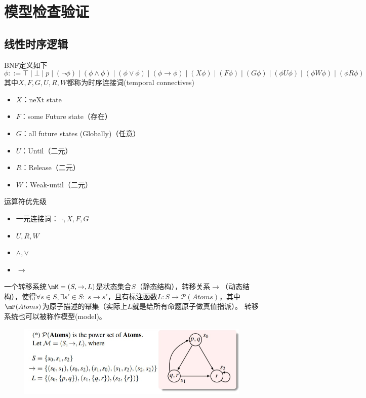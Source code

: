 
\section{模型检查验证}
\subsection{线性时序逻辑}
\begin{definition}
BNF定义如下
\[\phi::=\top\mid\bot\mid p\mid
(\lnot\phi)\mid
(\phi\land\phi)\mid
(\phi\lor\phi)\mid
(\phi\to\phi)\mid
(X\phi)\mid
(F\phi)\mid
(G\phi)\mid
(\phi U\phi)\mid
(\phi W\phi)\mid
(\phi R\phi)\]
其中$X,F,G,U,R,W$都称为时序连接词(temporal connectives)
\begin{itemize}
	\item $X$：neXt state
	\item $F$：some Future state（存在）
	\item $G$：all future states (Globally)（任意）
	\item $U$：Until（二元）
	\item $R$：Release（二元）
	\item $W$：Weak-until（二元）
\end{itemize}
运算符优先级
\begin{itemize}
	\item 一元连接词：$\lnot,X,F,G$
	\item $U,R,W$
	\item $\land,\lor$
	\item $\to$
\end{itemize}
\end{definition}
\begin{definition}
一个转移系统$\mM=(S,\to,L)$是状态集合$S$（静态结构），转移关系$\to$（动态结构），使得$\forall s\in S,\exists s'\in S:\;s\to s'$，且有标注函数$L:S\to\mathcal{P}(Atoms)$，其中$\mP(Atoms)$为原子描述的幂集（实际上$L$就是给所有命题原子做真值指派）。
转移系统也可以被称作模型(model)。
\end{definition}
\begin{figure}[H]
\centering
\includegraphics[width=0.8\linewidth]{fig/transition_system.jpg}
\end{figure}
